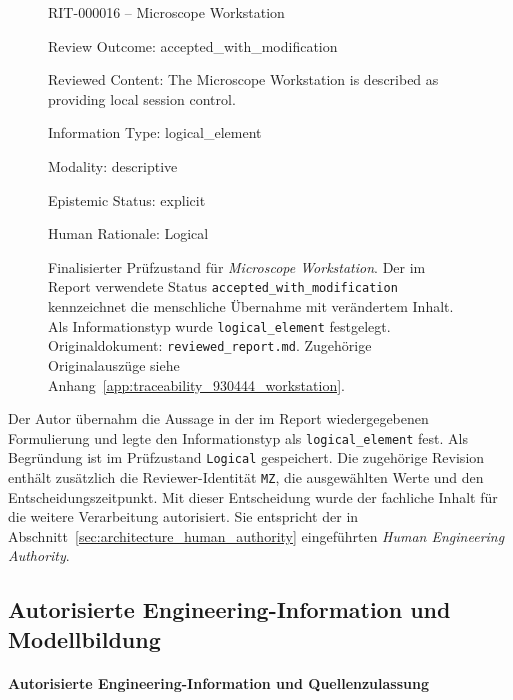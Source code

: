 \begin{figure}[htbp]
    \centering
    \begin{minipage}{0.94\textwidth}
        \begin{evidencebox}
RIT-000016 -- Microscope Workstation

Review Outcome:
  accepted_with_modification

Reviewed Content:
  The Microscope Workstation is described as providing
  local session control.

Information Type:
  logical_element

Modality:
  descriptive

Epistemic Status:
  explicit

Human Rationale:
  Logical
        \end{evidencebox}
    \end{minipage}
    \caption[Menschliche fachliche Prüfung der Microscope Workstation]{
    Finalisierter Prüfzustand für \emph{Microscope Workstation}. Der im
    Report verwendete Status \texttt{accepted\_with\_modification}
    kennzeichnet die menschliche Übernahme mit verändertem Inhalt. Als
    Informationstyp wurde \texttt{logical\_element} festgelegt.
    Originaldokument: \texttt{reviewed\_report.md}.
    Zugehörige Originalauszüge siehe
    Anhang~\ref{app:traceability_930444_workstation}.}
    \label{fig:result_930444_human_review}
\end{figure}

Der Autor übernahm die Aussage in der im Report wiedergegebenen
Formulierung und legte den Informationstyp als
\texttt{logical\_element} fest. Als Begründung ist im Prüfzustand
\texttt{Logical} gespeichert. Die zugehörige Revision enthält zusätzlich
die Reviewer-Identität \texttt{MZ}, die ausgewählten Werte und den
Entscheidungszeitpunkt. Mit dieser Entscheidung wurde der fachliche Inhalt
für die weitere Verarbeitung autorisiert. Sie entspricht der in
Abschnitt~\ref{sec:architecture_human_authority} eingeführten
\emph{Human Engineering Authority}.


\subsection{Autorisierte Engineering-Information und Modellbildung}
\label{sec:results_traceability_model}

\paragraph{Autorisierte Engineering-Information und Quellenzulassung}

